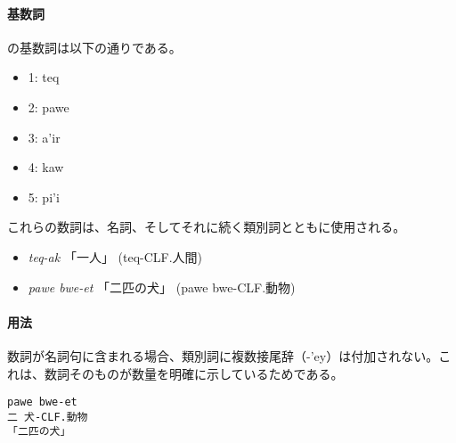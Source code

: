 \paragraph{基数詞}
\langname の基数詞は以下の通りである。
\begin{itemize}
    \item 1: teq
    \item 2: pawe
    \item 3: a'ir
    \item 4: kaw
    \item 5: pi'i
\end{itemize}

これらの数詞は、名詞、そしてそれに続く類別詞とともに使用される。
\begin{itemize}
    \item \textit{teq-ak} 「一人」 (teq-CLF.人間)
    \item \textit{pawe bwe-et} 「二匹の犬」 (pawe bwe-CLF.動物)
\end{itemize}

\paragraph{用法}
数詞が名詞句に含まれる場合、類別詞に複数接尾辞（-'ey）は付加されない。これは、数詞そのものが数量を明確に示しているためである。
\begin{verbatim}
pawe bwe-et
二 犬-CLF.動物
「二匹の犬」
\end{verbatim}